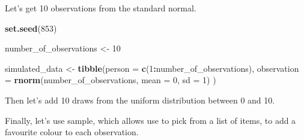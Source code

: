 \documentclass[
]{book}
\newenvironment{Shaded}{\begin{snugshade}}{\end{snugshade}}
\newcommand{\DataTypeTok}[1]{\textcolor[rgb]{0.13,0.29,0.53}{#1}}
\newcommand{\DecValTok}[1]{\textcolor[rgb]{0.00,0.00,0.81}{#1}}
\newcommand{\KeywordTok}[1]{\textcolor[rgb]{0.13,0.29,0.53}{\textbf{#1}}}
\newcommand{\NormalTok}[1]{#1}
\newcommand{\OperatorTok}[1]{\textcolor[rgb]{0.81,0.36,0.00}{\textbf{#1}}}
\newcommand{\OtherTok}[1]{\textcolor[rgb]{0.56,0.35,0.01}{#1}}
\newcommand{\StringTok}[1]{\textcolor[rgb]{0.31,0.60,0.02}{#1}}
\begin{document}
Let's get 10 observations from the standard normal.

\begin{Shaded}
\begin{Highlighting}[]
\KeywordTok{set.seed}\NormalTok{(}\DecValTok{853}\NormalTok{)}

\NormalTok{number_of_observations <-}\StringTok{ }\DecValTok{10}

\NormalTok{simulated_data <-}\StringTok{ }\KeywordTok{tibble}\NormalTok{(}\DataTypeTok{person =} \KeywordTok{c}\NormalTok{(}\DecValTok{1}\OperatorTok{:}\NormalTok{number_of_observations),}
                         \DataTypeTok{observation =} \KeywordTok{rnorm}\NormalTok{(number_of_observations, }
                                             \DataTypeTok{mean =} \DecValTok{0}\NormalTok{, }
                                             \DataTypeTok{sd =} \DecValTok{1}\NormalTok{)}
\NormalTok{                         )}
\end{Highlighting}
\end{Shaded}

Then let's add 10 draws from the uniform distribution between 0 and 10.

\begin{Shaded}
\end{Shaded}

Finally, let's use sample, which allows use to pick from a list of items, to add a favourite colour to each observation.

\begin{Shaded}
\end{Shaded}
\end{document}
